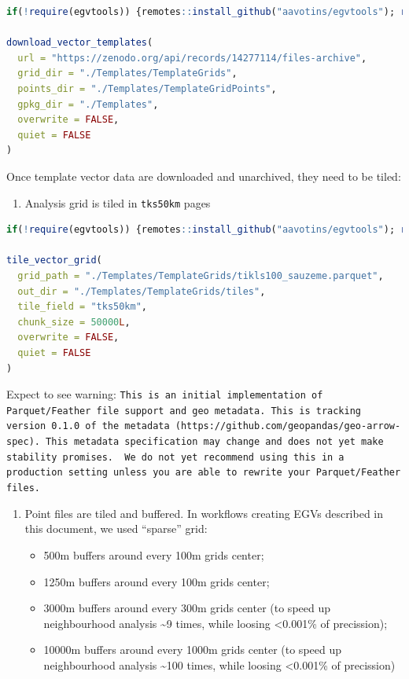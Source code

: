 \documentclass[
]{book}
\newcommand{\passthrough}[1]{#1}
\providecommand{\tightlist}{%
  \setlength{\itemsep}{0pt}\setlength{\parskip}{0pt}}
\begin{document}
\begin{lstlisting}[language=R]
if(!require(egvtools)) {remotes::install_github("aavotins/egvtools"); require(egvtools)}

download_vector_templates(
  url = "https://zenodo.org/api/records/14277114/files-archive",
  grid_dir = "./Templates/TemplateGrids",
  points_dir = "./Templates/TemplateGridPoints",
  gpkg_dir = "./Templates",
  overwrite = FALSE,
  quiet = FALSE
)
\end{lstlisting}

Once template vector data are downloaded and unarchived, they need to be tiled:

\begin{enumerate}
\def\labelenumi{\arabic{enumi}.}
\tightlist
\item
  Analysis grid is tiled in \passthrough{\lstinline!tks50km!} pages
\end{enumerate}

\begin{lstlisting}[language=R]
if(!require(egvtools)) {remotes::install_github("aavotins/egvtools"); require(egvtools)}

tile_vector_grid(
  grid_path = "./Templates/TemplateGrids/tikls100_sauzeme.parquet",
  out_dir = "./Templates/TemplateGrids/tiles",
  tile_field = "tks50km",
  chunk_size = 50000L,
  overwrite = FALSE,
  quiet = FALSE
)
\end{lstlisting}

Expect to see warning:
\passthrough{\lstinline!This is an initial implementation of Parquet/Feather file support and geo metadata. This is tracking version 0.1.0 of the metadata (https://github.com/geopandas/geo-arrow-spec). This metadata specification may change and does not yet make stability promises.  We do not yet recommend using this in a production setting unless you are able to rewrite your Parquet/Feather files.!}

\begin{enumerate}
\def\labelenumi{\arabic{enumi}.}
\setcounter{enumi}{1}
\item
  Point files are tiled and buffered. In workflows creating EGVs described in this document,
  we used ``sparse'' grid:

  \begin{itemize}
  \item
    500m buffers around every 100m grids center;
  \item
    1250m buffers around every 100m grids center;
  \item
    3000m buffers around every 300m grids center (to speed up neighbourhood analysis \textasciitilde9 times, while loosing \textless0.001\% of precission);
  \item
    10000m buffers around every 1000m grids center (to speed up neighbourhood analysis \textasciitilde100 times, while loosing \textless0.001\% of precission)
  \end{itemize}
\end{enumerate}
\end{document}

